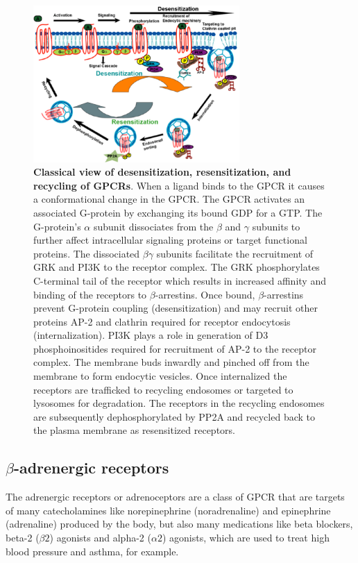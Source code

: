 \documentclass{book}
\begin{document}
\begin{figure}
   \centering
   \includegraphics[width=0.7\textwidth]{images3/image3.png}
   \caption{\textbf{Classical view of desensitization, resensitization, and recycling of GPCRs}. When a ligand binds to the GPCR it causes a conformational change in the GPCR. The GPCR activates an associated G-protein by exchanging its bound GDP for a GTP. The G-protein's $\alpha$ subunit dissociates from the $\beta$ and $\gamma$ subunits to further affect intracellular signaling proteins or target functional proteins. The dissociated $\beta \gamma$ subunits facilitate the recruitment of GRK and PI3K to the receptor complex. The GRK phosphorylates C-terminal tail of the receptor which results in increased affinity and binding of the receptors to $\beta$-arrestins. Once bound, $\beta$-arrestins prevent G-protein coupling (desensitization) and may recruit other proteins AP-2 and clathrin required for receptor endocytosis (internalization). PI3K plays a role in generation of D3 phosphoinositides required for recruitment of AP-2 to the receptor complex. The membrane buds inwardly and pinched off from the membrane to form endocytic vesicles. Once internalized the receptors are trafficked to recycling endosomes or targeted to lysosomes for degradation. The receptors in the recycling endosomes are subsequently dephosphorylated by PP2A and recycled back to the plasma membrane as resensitized receptors.}
\end{figure}


\subsection{$\beta$-adrenergic receptors}
The adrenergic receptors or adrenoceptors are a class of GPCR that are targets of many catecholamines like norepinephrine (noradrenaline) and epinephrine (adrenaline) produced by the body, but also many medications like beta blockers, beta-2 ($\beta 2$) agonists and alpha-2 ($\alpha 2$) agonists, which are used to treat high blood pressure and asthma, for example.
\end{document}

